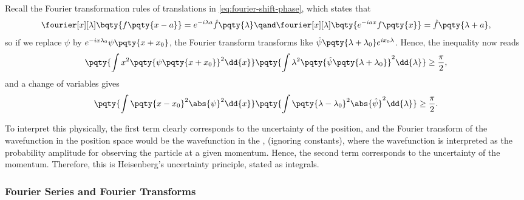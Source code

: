Recall the Fourier transformation rules of translations in \eqref{eq:fourier-shift-phase}, which states that
\begin{equation}
    \fourier[x][\lambda] \bqty{f\pqty{x - a}} = e^{- i \lambda a} \hat{f}\pqty{\lambda} \qand \fourier[x][\lambda] \bqty{e^{- i a x} f\pqty{x}} = \hat{f}\pqty{\lambda + a},
\end{equation}
so if we replace \(\psi\) by \(e^{- i x \lambda_0} \psi\pqty{x + x_0}\), the Fourier transform transforms like \(\hat{\psi}\pqty{\lambda + \lambda_0} e^{i x_0 \lambda}\). Hence, the inequality now reads
\begin{equation}
    \pqty{\int x^2 \pqty{\psi \pqty{x + x_0}}^2 \dd{x}} \pqty{\int \lambda^2 \pqty{\hat{\psi}\pqty{\lambda + \lambda_0}}^2 \dd{\lambda}} \geq \frac{\pi}{2},
\end{equation}
and a change of variables gives
\begin{equation}
    \pqty{\int \pqty{x - x_0}^2 \abs{\psi}^2 \dd{x}} \pqty{\int \pqty{\lambda - \lambda_0}^2 \abs{\hat{\psi}}^2 \dd{\lambda}} \geq \frac{\pi}{2}.
\end{equation}

To interpret this physically, the first term clearly corresponds to the uncertainty of the position, and the Fourier transform of the wavefunction in the position space would be the wavefunction in the , (ignoring constants), where the wavefunction is interpreted as the probability amplitude for observing the particle at a given momentum. Hence, the second term corresponds to the uncertainty of the momentum. Therefore, this is Heisenberg's uncertainty principle, stated as integrals.

\subsubsection{Fourier Series and Fourier Transforms}

